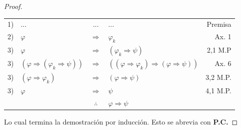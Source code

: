 \documentclass[12pt]{report}
\theoremstyle{largebreak}
\begin{document}
\begin{proof}
\begin{enumerate}
            \begin{center}
                \begin{tabular}{l l c l r}
                    1) & ... & ... & ... & Premisa \\
                    2) & $\varphi$ & $\Rightarrow$ & $\varphi_k$ & Ax. 1 \\
                    3) & $\varphi$ & $\Rightarrow$ & $(\varphi_k\Rightarrow\psi)$ & 2,1 M.P \\
                    3) & $(\varphi\Rightarrow(\varphi_k\Rightarrow\psi))$ & $\Rightarrow$ & $((\varphi\Rightarrow\varphi_k)\Rightarrow(\varphi\Rightarrow\psi))$ & Ax. 6 \\
                    3) & $(\varphi\Rightarrow\varphi_k)$ & $\Rightarrow$ & $(\varphi\Rightarrow\psi)$ & 3,2 M.P. \\
                    3) & $\varphi$ & $\Rightarrow$ & $\psi$ & 4,1 M.P. \\
                    \hline
                    & & $\therefore$ & $\varphi\Rightarrow\psi$ & \\
                \end{tabular}
            \end{center}

        \end{enumerate}

        Lo cual termina la demostración por inducción. Esto se abrevia con \textbf{P.C.}
    \end{proof}
\end{document}
